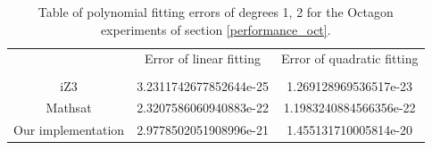 \begin{table}[h]
  \centering
  \begin{tabular}{ccc}
    \toprule
    {}                 & Error of linear fitting & Error of quadratic fitting \\
    \cmidrule{2-2} \cmidrule{3-3}                                             \\
    iZ3                & 3.2311742677852644e-25 & 1.269128969536517e-23       \\
    Mathsat            & 2.3207586060940883e-22 & 1.1983240884566356e-22      \\
    Our implementation & 2.9778502051908996e-21 & 1.455131710005814e-20       \\
    \bottomrule
  \end{tabular}
  \caption{Table of polynomial fitting errors of degrees 1, 2 for the
  Octagon experiments of section \ref{performance_oct}.}
\end{table}

